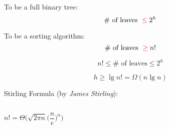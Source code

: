 \begin{frame}{}
  \begin{center}
    {\Large {}} 
  \end{center}

  \centering
  \vspace{0.30cm}

  \pause
  \vspace{0.30cm}
  \begin{alertblock}{To be a full binary tree:}
    \[
      \# \text{ of leaves } \;\textcolor{red}{\le}\; 2^h
    \]
  \end{alertblock}

  \pause
  \vspace{0.50cm}
  \begin{alertblock}{To be a  sorting algorithm:}
    \[
      \# \text{ of leaves } \;\textcolor{red}{\ge}\; n!
    \]
  \end{alertblock}
\end{frame}

\begin{frame}{}
  \begin{center}
    {\Large {}} 
  \end{center}

  \[
    \boxed{n! \le \# \text{ of leaves} \le 2^h}
  \]

  \pause
  \[
    h \ge \lg n! = \Omega(n \lg n)
  \]

  \pause
  \vspace{0.60cm}
  \begin{alertblock}{Stirling Formula (by {\it James Stirling}):}
    \begin{columns}
	\[
	  n! = \Theta\Big(\sqrt{2 \pi n} \Big(\frac{n}{e}\Big)^{n}\Big)
	\]
    \end{columns}
  \end{alertblock}
\end{frame}

